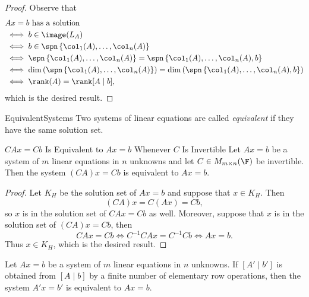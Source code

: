 \documentclass[linearalgebra]{subfiles}
\begin{document}
    \begin{proof}
        Observe that
        \begin{align*}
            & Ax=b\text{ has a solution} \\ 
            & \iff b\in \image(L_A) \\
            & \iff b\in \spn \left\lbrace \col_1(A), \ldots, \col_n(A) \right\rbrace \\
            & \iff \spn \left\lbrace \col_1(A), \ldots, \col_n(A) \right\rbrace = \spn \left\lbrace \col_1(A), \ldots, \col_n(A), b \right\rbrace \\
            & \iff \dim \left( \spn \left\lbrace \col_1(A), \ldots, \col_n(A) \right\rbrace \right) = \dim \left( \spn \left\lbrace \col_1(A), \ldots, \col_n(A), b \right\rbrace \right) \\
            & \iff \rank(A) = \rank [A\mid b],
        \end{align*}
        which is the desired result.
    \end{proof}

    \begin{definition}{Equivalent}{Systems}
        Two systems of linear equations are called \emph{equivalent} if they have the same solution set.
    \end{definition}

    \begin{prop}{$CAx=Cb$ Is Equivalent to $Ax=b$ Whenever $C$ Is Invertible}
            Let $Ax=b$ be a system of $m$ linear equations in $n$ unknowns and let $C\in M_{m\times n}(\F)$ be invertible. Then the system $(CA)x = Cb$ is equivalent to $Ax = b$.
    \end{prop}

    \begin{proof}
        Let $K_H$ be the solution set of $Ax=b$ and suppose that $x\in K_H$. Then
        \begin{equation*}
            (CA)x = C(Ax) = Cb,
        \end{equation*}
        so $x$ is in the solution set of $CAx=Cb$ as well. Moreover, suppose that $x$ is in the solution set of $(CA)x = Cb$, then
        \begin{equation*}
            CAx = Cb \iff C^{-1}CAx = C^{-1}Cb \iff Ax = b.
        \end{equation*}
        Thus $x\in K_H$, which is the desired result.
    \end{proof}

    \begin{cor}{}
        Let $Ax=b$ be a system of $m$ linear equations in $n$ unknowns. If $[A'\mid b']$ is obtained from $[A\mid b]$ by a finite number of elementary row operations, then the system $A'x=b'$ is equivalent to $Ax=b$.
    \end{cor}	
\end{document}
